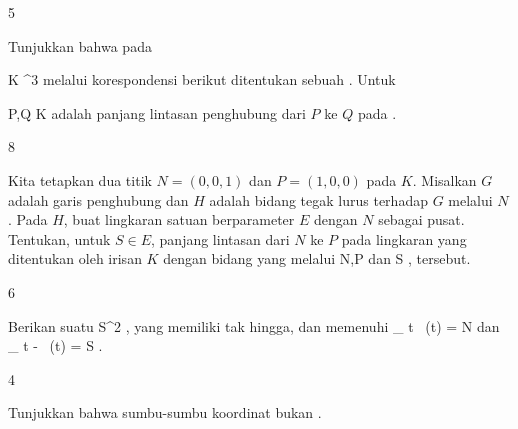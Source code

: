{5}
{

Tunjukkan bahwa pada

\mavergleichskette
{\vergleichskette
{ K
}
{ \subset }{ \R^3
}
{  }{
}
{    }{
}
{   }{
}
}
{}{}{}
melalui korespondensi berikut ditentukan sebuah
 . Untuk

\mavergleichskette
{\vergleichskette
{ P,Q
}
{ \in }{ K
}
{  }{
}
{    }{
}
{   }{
}
}
{}{}{}
 adalah panjang lintasan penghubung
 {} {} dari $P$ ke $Q$ pada
 {} {.}

}
{} {}

{8}
{

Kita tetapkan dua titik $N=(0,0,1)$ dan $P=(1,0,0)$ pada
 $K$. Misalkan $G$ adalah garis penghubung dan $H$ adalah bidang tegak lurus terhadap $G$ melalui $N$. Pada $H$, buat lingkaran satuan berparameter $E$ dengan $N$ sebagai pusat. Tentukan, untuk $S \in E$, panjang lintasan
 {} {} dari $N$ ke $P$ pada lingkaran yang ditentukan oleh irisan $K$ dengan bidang yang melalui
\mathkor {} {N,P} {dan} {S} {},
tersebut.

}
{} {}

{6}
{

Berikan suatu
\maabbdisp {\varphi} {\R} {S^2
} {,}
yang
 {} {}
memiliki
tak hingga, dan memenuhi
\mathkor {} {_{   t  \rightarrow  \infty  } \, \varphi (t) = N} {dan} {_{   t  \rightarrow  - \infty  } \, \varphi (t) = S} {}.

}
{} {}

{4}
{

Tunjukkan bahwa sumbu-sumbu koordinat bukan
.

}
{} {}
